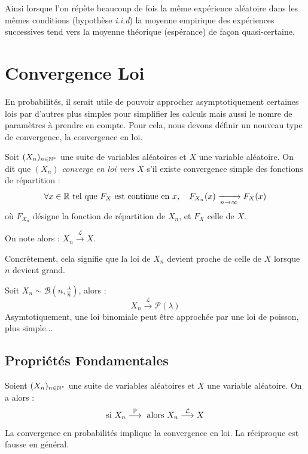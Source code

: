 Ainsi lorsque l'on répète beaucoup de fois la même expérience aléatoire dans les mêmes conditions (hypothèse \emph{i.i.d})
la moyenne empirique des expériences successives tend vers la moyenne théorique (espérance) de façon 
quasi-certaine. 



\section{Convergence Loi}

En probabilités, il serait utile de pouvoir approcher asymptotiquement certaines lois par d'autres plus simples
pour simplifier les calculs mais aussi le nomre de paramètres à prendre en compte. 
Pour cela, nous devons définir un nouveau type de convergence, la convergence en loi. 

\begin{definition}
    Soit $(X_n)_{n \in \mathbb{N}^*}$ une suite de variables aléatoires et $X$ une variable aléatoire. 
    On dit que \emph{$(X_n)$ converge en loi vers $X$} s’il existe convergence simple des fonctions de répartition :
    \[
        \forall x \in \mathbb{R} \text{ tel que } F_X \text{ est continue en } x, \quad 
        F_{X_n}(x) \xrightarrow[n \to \infty]{} F_X(x)
    \]
    où $F_{X_n}$ désigne la fonction de répartition de $X_n$, et $F_X$ celle de $X$.  

    On note alors : \( X_n \xrightarrow{\mathcal{L}} X \).

    Concrètement, cela signifie que la loi de $X_n$ devient proche de celle de $X$ lorsque $n$ devient grand.
\end{definition}

\begin{example}
    Soit $X_n \sim \mathcal{B}(n, \frac{\lambda}{n})$, alors : 
        \[ X_n \overset{ \mathcal{L}}{\longrightarrow} \mathcal{P}(\lambda) \] 
    Asymtotiquement, une loi binomiale peut être approchée par une loi de poisson, plus simple...
\end{example}

\subsection{Propriétés Fondamentales}

\begin{prop}
    Soient $(X_n)_{n \in \mathbb{N}^*}$ une suite de variables aléatoires et $X$ une variable aléatoire. 
    On a alors : 
        \[ \text{si } X_n \overset{\mathbb{P}}{\longrightarrow} \text{ alors } X_n \overset{ \mathcal{L}}{\longrightarrow} X \] 
        La convergence en probabilités implique la convergence en loi. La réciproque est fausse en général. 
\end{prop}

